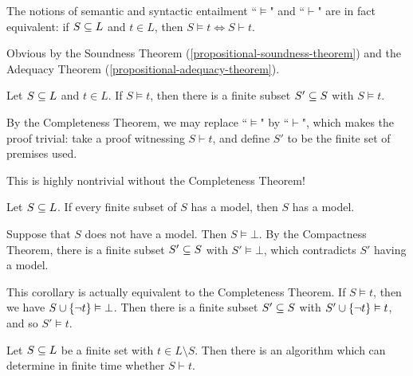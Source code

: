 \documentclass{article}
\begin{document}
\begin{theorem}
	\label{propositional-completeness-theorem}
    The notions of semantic and syntactic entailment ``$\vDash$" and ``$\vdash$" are in fact equivalent: if $S \subseteq L$ and $t \in L$, then $S \vDash t \iff S \vdash t$.
\end{theorem}

\begin{prf}
    Obvious by the Soundness Theorem (\ref{propositional-soundness-theorem}) and the Adequacy Theorem (\ref{propositional-adequacy-theorem}).
\end{prf}

\begin{theorem}
	\label{propositional-compactness-theorem}
    Let $S \subseteq L$ and $t \in L$. If $S \vDash t$, then there is a finite subset $S' \subseteq S$ with $S \vDash t$.
\end{theorem}

\begin{prf}
    By the Completeness Theorem, we may replace ``$\vDash$" by ``$\vdash$", which makes the proof trivial: take a proof witnessing $S \vdash t$, and define $S'$ to be the finite set of premises used.
\end{prf}

\begin{note}
	This is highly nontrivial without the Completeness Theorem!
\end{note}

\begin{corollary}
    Let $S \subseteq L$. If every finite subset of $S$ has a model, then $S$ has a model.
\end{corollary}

\begin{prf}
    Suppose that $S$ does not have a model. Then $S \vDash \bot$. By the Compactness Theorem, there is a finite subset $S' \subseteq S$ with $S' \vDash \bot$, which contradicts $S'$ having a model.
\end{prf}

\begin{note}
	This corollary is actually equivalent to the Completeness Theorem. If $S \vDash t$, then we have $S \cup \left\lbrace \lnot t \right\rbrace \vDash \bot$. Then there is a finite subset $S' \subseteq S$ with $S' \cup \left\lbrace \lnot t \right\rbrace \vDash t$, and so $S' \vDash t$.
\end{note}

\begin{theorem}
    Let $S \subseteq L$ be a finite set with $t \in L \setminus S$. Then there is an algorithm which can determine in finite time whether $S \vdash t$.
\end{theorem}
\end{document}
